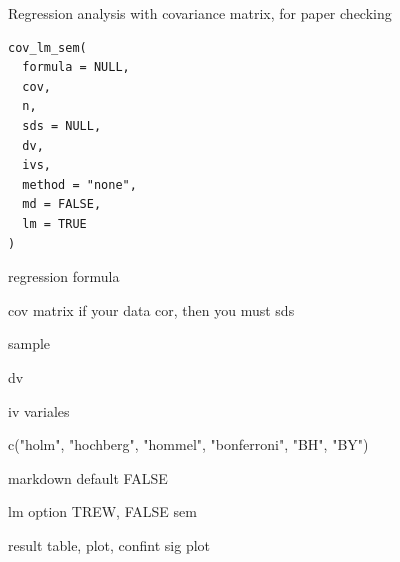 \documentclass[a4paper]{book}
\begin{document}
%
\begin{Description}
Regression analysis with covariance matrix, for paper checking
\end{Description}
%
\begin{Usage}
\begin{verbatim}
cov_lm_sem(
  formula = NULL,
  cov,
  n,
  sds = NULL,
  dv,
  ivs,
  method = "none",
  md = FALSE,
  lm = TRUE
)
\end{verbatim}
\end{Usage}
%
\begin{Arguments}
\begin{ldescription}
\item[\code{formula}] regression formula

\item[\code{cov}] cov matrix if your data cor, then you must sds

\item[\code{n}] sample

\item[\code{dv}] dv

\item[\code{ivs}] iv variales

\item[\code{method}] c("holm", "hochberg", "hommel", "bonferroni", "BH", "BY")

\item[\code{md}] markdown default FALSE

\item[\code{lm}] lm option TREW, FALSE sem
\end{ldescription}
\end{Arguments}
%
\begin{Value}
result table, plot, confint sig plot
\end{Value}
%
\end{document}
